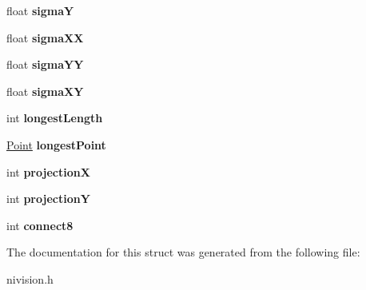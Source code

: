 \begin{DoxyCompactItemize}
\item 
\hypertarget{structParticleReport__struct_a2a5f2d03144f772a27375934b74e5e0a}{float {\bfseries sigma\-Y}}\label{structParticleReport__struct_a2a5f2d03144f772a27375934b74e5e0a}

\item 
\hypertarget{structParticleReport__struct_accee62e007be8a3fdd51c158c3621efd}{float {\bfseries sigma\-X\-X}}\label{structParticleReport__struct_accee62e007be8a3fdd51c158c3621efd}

\item 
\hypertarget{structParticleReport__struct_a845e4d4a64e40fc7ae8e41dc06eaca75}{float {\bfseries sigma\-Y\-Y}}\label{structParticleReport__struct_a845e4d4a64e40fc7ae8e41dc06eaca75}

\item 
\hypertarget{structParticleReport__struct_a0e8763cbd7dc6b757056c92671a854cf}{float {\bfseries sigma\-X\-Y}}\label{structParticleReport__struct_a0e8763cbd7dc6b757056c92671a854cf}

\item 
\hypertarget{structParticleReport__struct_add5a830082fa191e6e4645246de2ec8a}{int {\bfseries longest\-Length}}\label{structParticleReport__struct_add5a830082fa191e6e4645246de2ec8a}

\item 
\hypertarget{structParticleReport__struct_aa79d31c7062140ee3a692e5f5195e6df}{\hyperlink{structPoint__struct}{\-Point} {\bfseries longest\-Point}}\label{structParticleReport__struct_aa79d31c7062140ee3a692e5f5195e6df}

\item 
\hypertarget{structParticleReport__struct_a4649df82483113e98bc0e88ce14ea212}{int {\bfseries projection\-X}}\label{structParticleReport__struct_a4649df82483113e98bc0e88ce14ea212}

\item 
\hypertarget{structParticleReport__struct_ab6426e0afd854df2b4d268ee0ca5dcf8}{int {\bfseries projection\-Y}}\label{structParticleReport__struct_ab6426e0afd854df2b4d268ee0ca5dcf8}

\item 
\hypertarget{structParticleReport__struct_ac8af75154678c1c4bc3b3952ca2d6ede}{int {\bfseries connect8}}\label{structParticleReport__struct_ac8af75154678c1c4bc3b3952ca2d6ede}

\end{DoxyCompactItemize}


\-The documentation for this struct was generated from the following file\-:\begin{DoxyCompactItemize}
\item 
nivision.\-h\end{DoxyCompactItemize}
